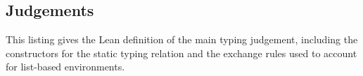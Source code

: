 



\subsection{Judgements}\label{app:judgement-basic-definition}
This listing gives the Lean definition of the main typing judgement, including the constructors for the static \pill{} typing relation and the exchange rules used to account for list-based environments.

